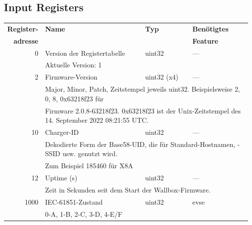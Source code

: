 \documentclass[a4paper,10pt]{article}
\newcommand{\tdesc}[1]{\multicolumn{3}{l}{\footnotesize #1}}
\begin{document}
\subsection{Input Registers}
\begin{tabularx}{\textwidth}{rXll} \toprule
    \textbf{Register-} & \textbf{Name}& \textbf{Typ} & \textbf{Benötigtes}                                                      \\
    \textbf{adresse}   &              &              & \textbf{Feature}                                                         \\ \midrule
0             & Version der Registertabelle             & uint32       & ---                                     \\
              & \tdesc{Aktuelle Version: 1}                                                                                     \\ \cmidrule{2-4}
2             & Firmware-Version                       & uint32 (x4)       & ---                                                    \\
              & \tdesc{Major, Minor, Patch, Zeitstempel jeweils uint32. Beispielsweise 2, 0, 8, 0x63218f23 für}                 \\
              & \tdesc{Firmware 2.0.8-63218f23. 0x63218f23 ist der Unix-Zeitstempel des 14. September 2022 08:21:55 UTC.}       \\ \cmidrule{2-4}
10            & Charger-ID                              & uint32       & ---                                                    \\
              & \tdesc{Dekodierte Form der Base58-UID, die für Standard-Hostnamen, -SSID usw. genutzt wird.}                    \\
              & \tdesc{Zum Beispiel 185460 für X8A}                                                                             \\ \cmidrule{2-4}
12            & Uptime (s)                              & uint32       & ---                                                    \\
              & \tdesc{Zeit in Sekunden seit dem Start der Wallbox-Firmware.}                                                   \\ \cmidrule{2-4}
1000          & IEC-61851-Zustand                       & uint32       & evse                                                   \\
              & \tdesc{0-A, 1-B, 2-C, 3-D, 4-E/F}                                                                               \\ \cmidrule{2-4}

\end{tabularx}
\end{document}
